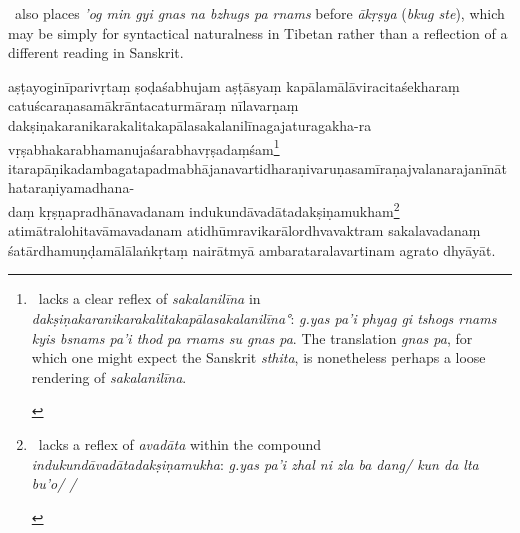 \documentclass[naipra.tex]{subfiles}
\begin{document}
\begin{sanskrit}
{\begin{english}
	\TIB\ also places \emph{'og min gyi gnas na bzhugs pa rnams} before \emph{ākṛṣya} (\emph{bkug ste}), which may be simply for syntactical naturalness in Tibetan rather than a reflection of a different reading in Sanskrit.
\end{english}} aṣṭayoginīparivṛtaṃ ṣoḍaśabhujam aṣṭāsyaṃ kapālamālāviracitaśekharaṃ catuścaraṇasamākrāntacaturmāraṃ nīlavarṇaṃ dakṣiṇakaranikarakalitakapālasakalanilīnagaja\dsh turaga\dsh kha-ra \dsh vṛṣabha\dsh karabha\dsh manuja\dsh śarabha\dsh vṛṣadaṃśam\footnote{\begin{english}
	\TIB\ lacks a clear reflex of \emph{sakalanilīna} in \emph{dakṣiṇakaranikarakalitakapālasakalanilīna°}: \emph{g.yas pa'i phyag gi tshogs rnams kyis bsnams pa'i thod pa rnams su gnas pa}.
	The translation \emph{gnas pa}, for which one might expect the Sanskrit \emph{sthita}, is nonetheless perhaps a loose rendering of \emph{sakalanilīna}.
\end{english}} itarapāṇikadambagatapadmabhājanavartidharaṇi\dsh varuṇa\dsh samīraṇa\dsh jvalana\dsh rajanīnātha\dsh taraṇi\dsh yama\dsh dhana-\\ daṃ kṛṣṇapradhānavadanam indukundāvadātadakṣiṇamukham\footnote{\begin{english}
	\TIB\ lacks a reflex of \emph{avadāta} within the compound \emph{indukundāvadātadakṣiṇamukha}: \emph{g.yas pa'i zhal ni zla ba dang/ kun da lta bu'o/ /}
\end{english}} atimātralohitavāmavadanam atidhūmravikarālordhvavaktram sakalavadanaṃ śatārdhamuṇḍamālālaṅkṛtaṃ nairātmyā ambarataralavartinam agrato dhyāyāt. 
\pend




\end{sanskrit}
\end{document}
